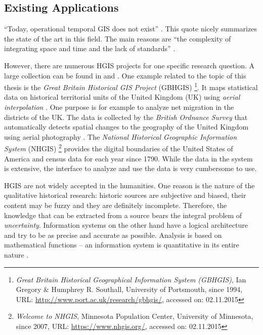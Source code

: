 
\subsection{Existing Applications} %
\label{sub:applications}

``Today, operational temporal GIS does not exist''
\cite[p. 5]{raza12}.
This quote nicely summarizes the state of the art in this field. The main reasons are ``the complexity of integrating space and time and the lack of standards''
\cite[p. 5]{raza12}.

However, there are numerous HGIS projects for one specific research question. A large collection can be found in \cite{knowles2008placing} and \cite{gregory2014toward}.
One example related to the topic of this thesis is the \emph{Great Britain Historical GIS Project} (GBHGIS)
\footnote{
  \textit{Great Britain Historical Geographical Information System (GBHGIS)},
  Ian Gregory \& Humphrey R. Southall, University of Portsmouth, since 1994,
  URL: \url{http://www.port.ac.uk/research/gbhgis/},
  accessed on: 02.11.2015
}.
It maps statistical data on historical territorial units of the United Kingdom (UK) using \emph{aerial interpolation}
\cite{aerialInterpolation}.
One purpose is for example to analyze net migration in the districts of the UK. The data is collected by the \emph{British Ordnance Survey} that automatically detects spatial changes to the geography of the United Kingdom using aerial photography \cite{ordnanceSurvey}.
The \emph{National Historical Geographic Information System} (NHGIS)
\footnote{
  \textit{Welcome to NHGIS},
  Minnesota Population Center, University of Minnesota,
  since 2007,
  URL: \url{https://www.nhgis.org/},
  accessed on: 02.11.2015
}
provides the digital boundaries of the United States of America and census data for each year since 1790. While the data in the system is extensive, the interface to analyze and use the data is very cumbersome to use.

HGIS are not widely accepted in the humanities. One reason is the nature of the qualitative historical research: historic sources are subjective and biased, their content may be fuzzy and they are definitely incomplete. Therefore, the knowledge that can be extracted from a source bears the integral problem of \emph{uncertainty}. Information systems on the other hand have a logical architecture and try to be as precise and accurate as possible. Analysis is based on mathematical functions -- an information system is quantitative in its entire nature
\cite[p. 2]{knowles2008placing}.


